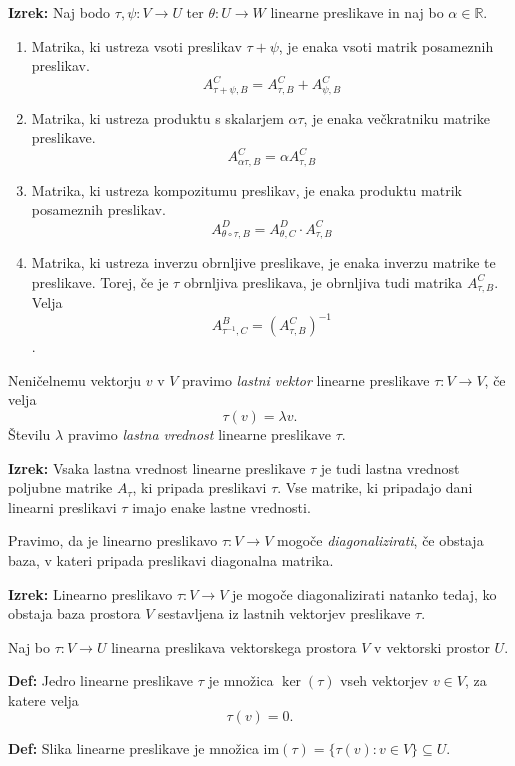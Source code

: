\documentclass{article}
\begin{document}
\begin{multicols}{2}
\textbf{Izrek:} Naj bodo \( \tau, \psi: V \to U \) ter \( \theta: U \to W \) linearne preslikave in naj bo \( \alpha \in \mathbb{R} \).
\begin{enumerate}
    \item Matrika, ki ustreza vsoti preslikav \( \tau + \psi \), je enaka vsoti matrik posameznih preslikav.
    \[ A_{\tau+\psi,B}^C = A_{\tau,B}^C + A_{\psi,B}^C \]
    \item Matrika, ki ustreza produktu s skalarjem \( \alpha\tau \), je enaka večkratniku matrike preslikave.
    \[ A_{\alpha\tau,B}^C = \alpha A_{\tau,B}^C \]
    \item Matrika, ki ustreza kompozitumu preslikav, je enaka produktu matrik posameznih preslikav.
    \[ A_{\theta\circ\tau,B}^D = A_{\theta,C}^D \cdot A_{\tau,B}^C \]
    \item Matrika, ki ustreza inverzu obrnljive preslikave, je enaka inverzu matrike te preslikave. Torej, če je \( \tau \) obrnljiva preslikava, je obrnljiva tudi matrika \( A_{\tau,B}^C \). Velja
    \[ A_{\tau^{-1},C}^B = (A_{\tau,B}^C)^{-1} \].
\end{enumerate}


Neničelnemu vektorju \( v \) v \( V \) pravimo \textit{lastni vektor} linearne preslikave \( \tau: V \to V \), če velja
\[ \tau(v) = \lambda v. \]
Številu \( \lambda \) pravimo \textit{lastna vrednost} linearne preslikave \( \tau \).

\textbf{Izrek:} Vsaka lastna vrednost linearne preslikave \( \tau \) je tudi lastna vrednost poljubne matrike \( A_{\tau} \), ki pripada preslikavi \( \tau \). Vse matrike, ki pripadajo dani linearni preslikavi \( \tau \) imajo enake lastne vrednosti.

Pravimo, da je linearno preslikavo \( \tau: V \to V \) mogoče \textit{diagonalizirati}, če obstaja baza, v kateri pripada preslikavi diagonalna matrika.

\textbf{Izrek:} Linearno preslikavo \( \tau: V \to V \) je mogoče diagonalizirati natanko tedaj, ko obstaja baza prostora \( V \) sestavljena iz lastnih vektorjev preslikave \( \tau \).

Naj bo \( \tau: V \rightarrow U \) linearna preslikava vektorskega prostora \( V \) v vektorski prostor \( U \).

\textbf{Def:} Jedro linearne preslikave \( \tau \) je množica \( \ker(\tau) \) vseh vektorjev \( v \in V \), za katere velja
\[ \tau(v) = 0. \]

\textbf{Def:} Slika linearne preslikave je množica \( \text{im}(\tau) = \{ \tau(v) : v \in V \} \subseteq U \).


\end{multicols}
\end{document}
